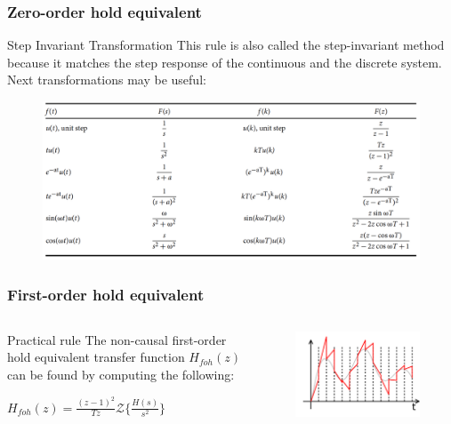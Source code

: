 \begin{frame}
	\frametitle{Zero-order hold equivalent}
	\begin{block}{Step Invariant Transformation}
		This rule is also called the step-invariant method because it matches the step response of the continuous and the discrete system. Next transformations may be useful:
		\vspace{-1em}
		\begin{figure}
			\centering
			\includegraphics[width=0.85\linewidth]{step_inv}
		\end{figure}
	\end{block}
\end{frame}

\begin{frame}
	\frametitle{First-order hold equivalent}
\begin{columns}
	\begin{column}{0.5\textwidth}
	\begin{block}{Practical rule}
		The non-causal first-order hold equivalent transfer function $H_{foh}(z)$ can be found by computing the following:
		\begin{center}
			$H_{foh}(z) = \frac{(z-1)^{2}}{Tz} \mathcal{Z}\{\frac{H(s)}{s^{2}}\}$
		\end{center}
	\end{block}
	\end{column}
	
	\begin{column}{0.5\textwidth}
		\begin{figure}
			\centering
			\includegraphics[width=1\linewidth]{first-order}
		\end{figure}
	\end{column}
\end{columns}
\end{frame}

